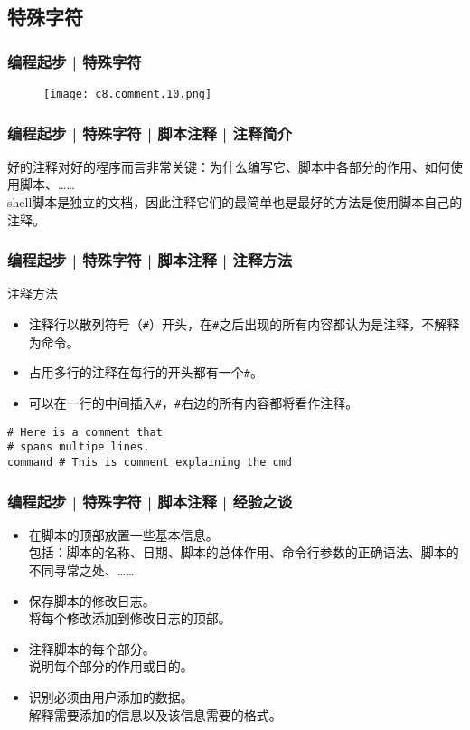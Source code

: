 \subsection{特殊字符}
\begin{frame}
  \frametitle{编程起步 | \alert{特殊字符}}
  \begin{figure}
    \centering
    \texttt{[image: c8.comment.10.png]}
  \end{figure}
\end{frame}

\begin{frame}
  \frametitle{编程起步 | 特殊字符 | 脚本注释 | 注释简介}
  好的注释对好的程序而言非常关键：为什么编写它、脚本中各部分的作用、如何使用脚本、……\\
  shell脚本是独立的文档，因此注释它们的最简单也是最好的方法是使用脚本自己的注释。
\end{frame}

\begin{frame}[fragile]
  \frametitle{编程起步 | 特殊字符 | 脚本注释 | \alert{注释方法}}
  \begin{block}{注释方法}
    \begin{itemize}
      \item 注释行以散列符号（\verb|#|）开头，在\verb|#|之后出现的所有内容都认为是注释，不解释为命令。
      \item 占用多行的注释在每行的开头都有一个\verb|#|。
      \item 可以在一行的中间插入\verb|#|，\verb|#|右边的所有内容都将看作注释。
    \end{itemize}
  \end{block}
  \pause
\begin{lstlisting}
# Here is a comment that
# spans multipe lines.
command # This is comment explaining the cmd
\end{lstlisting}
\end{frame}

\begin{frame}
  \frametitle{编程起步 | 特殊字符 | 脚本注释 | 经验之谈}
  \begin{itemize}
    \item 在脚本的顶部放置一些基本信息。\\ \qquad 包括：脚本的名称、日期、脚本的总体作用、命令行参数的正确语法、脚本的不同寻常之处、……
    \item 保存脚本的修改日志。\\ \qquad 将每个修改添加到修改日志的顶部。
    \item 注释脚本的每个部分。\\ \qquad 说明每个部分的作用或目的。
    \item 识别必须由用户添加的数据。\\ \qquad 解释需要添加的信息以及该信息需要的格式。
  \end{itemize}
\end{frame}

